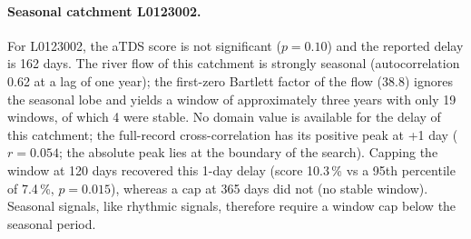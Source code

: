 \documentclass[11pt,a4paper]{article}
\begin{document}
\paragraph{Seasonal catchment L0123002.} For L0123002, the aTDS score is not significant ($p = 0.10$) and the reported delay is 162 days. The river flow of this catchment is strongly seasonal (autocorrelation 0.62 at a lag of one year); the first-zero Bartlett factor of the flow (38.8) ignores the seasonal lobe and yields a window of approximately three years with only 19 windows, of which 4 were stable. No domain value is available for the delay of this catchment; the full-record cross-correlation has its positive peak at +1 day ($r = 0.054$; the absolute peak lies at the boundary of the search). Capping the window at 120 days recovered this 1-day delay (score 10.3\,\% vs a 95th percentile of 7.4\,\%, $p = 0.015$), whereas a cap at 365 days did not (no stable window). Seasonal signals, like rhythmic signals, therefore require a window cap below the seasonal period.

\begin{table}[!htbp]
\centering
\caption{aTDS on records from other fields, with parameters. Score vs the 95th percentile of 200 rotated copies (null95); delay found = $-\tau_0$, with $\tau_0$ the most frequent value among stable windows, positive when the driver (rain, temperature, crude oil) leads.}
\label{tab:fieldsfull}
\footnotesize
{}
\end{table}
\end{document}
